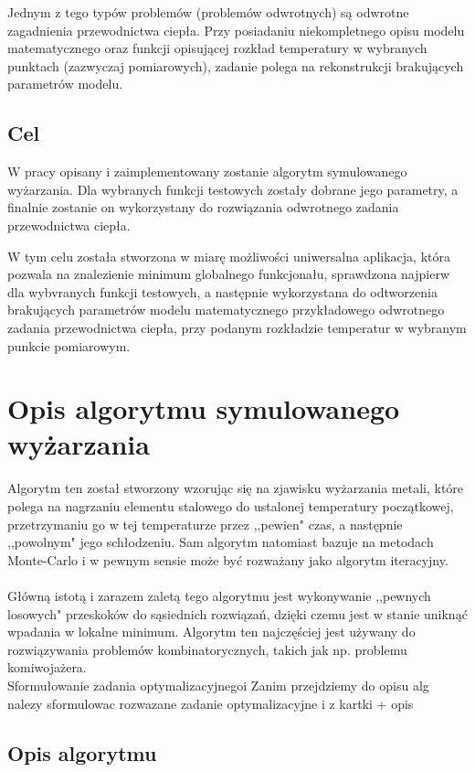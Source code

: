 \documentclass[twoside]{projektInzynierskiMS1}
\newcommand{\newLine}{~\\}
\newcommand{\si}{ś}
\begin{document}
Jednym z tego typów problemów (problemów odwrotnych) są odwrotne zagadnienia przewodnictwa ciepła. Przy posiadaniu niekompletnego opisu modelu matematycznego oraz funkcji opisującej rozkład temperatury w wybranych punktach (zazwyczaj pomiarowych), zadanie polega na rekonstrukcji brakujących parametrów modelu. 

\subsection{Cel}

W pracy opisany i zaimplementowany zostanie algorytm symulowanego wyżarzania. Dla wybranych funkcji testowych zostały dobrane jego parametry, a finalnie zostanie on wykorzystany do rozwiązania odwrotnego zadania przewodnictwa ciepła.

W tym celu została stworzona w miarę możliwo\si ci uniwersalna aplikacja, która pozwala na znalezienie minimum globalnego funkcjonału, sprawdzona najpierw dla wybvranych funkcji testowych, a następnie wykorzystana do odtworzenia brakujących parametrów modelu matematycznego przykładowego odwrotnego zadania przewodnictwa ciepła, przy podanym rozkładzie temperatur w wybranym punkcie pomiarowym.


\section{Opis algorytmu symulowanego wyżarzania}
				Algorytm ten został stworzony wzorując się na zjawisku wyżarzania metali, które polega na nagrzaniu elementu stalowego do ustalonej temperatury początkowej, przetrzymaniu go w tej temperaturze przez ,,pewien" czas, a następnie ,,powolnym" jego schłodzeniu. Sam algorytm natomiast bazuje na metodach Monte-Carlo i w pewnym sensie może być rozważany jako algorytm iteracyjny.\\ \newLine
Główną istotą i zarazem zaletą tego algorytmu jest wykonywanie ,,pewnych losowych" przeskoków do sąsiednich rozwiązań, dzięki czemu jest w stanie uniknąć wpadania w lokalne minimum. Algorytm ten najczę\si ciej jest używany do rozwiązywania problemów kombinatorycznych, takich jak np. problemu komiwojażera. \\

Sformułowanie zadania optymalizacyjnegoi
Zanim przejdziemy do opisu alg  nalezy sformulowac rozwazane zadanie optymalizacyjne
i z kartki + opis

		\subsection{Opis algorytmu}
		
\end{document}
